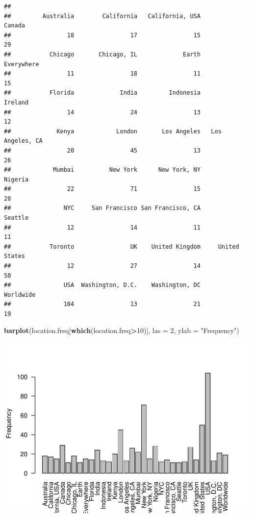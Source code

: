 \documentclass[
]{article}
\newenvironment{Shaded}{\begin{snugshade}}{\end{snugshade}}
\newcommand{\DataTypeTok}[1]{\textcolor[rgb]{0.13,0.29,0.53}{#1}}
\newcommand{\DecValTok}[1]{\textcolor[rgb]{0.00,0.00,0.81}{#1}}
\newcommand{\KeywordTok}[1]{\textcolor[rgb]{0.13,0.29,0.53}{\textbf{#1}}}
\newcommand{\NormalTok}[1]{#1}
\newcommand{\OperatorTok}[1]{\textcolor[rgb]{0.81,0.36,0.00}{\textbf{#1}}}
\newcommand{\StringTok}[1]{\textcolor[rgb]{0.31,0.60,0.02}{#1}}
\begin{document}
\begin{verbatim}
## 
##         Australia        California   California, USA            Canada 
##                18                17                15                29 
##           Chicago       Chicago, IL             Earth        Everywhere 
##                11                18                11                15 
##           Florida             India         Indonesia           Ireland 
##                14                24                13                12 
##             Kenya            London       Los Angeles   Los Angeles, CA 
##                20                45                13                26 
##            Mumbai          New York      New York, NY           Nigeria 
##                22                71                15                28 
##               NYC     San Francisco San Francisco, CA           Seattle 
##                12                14                11                11 
##           Toronto                UK    United Kingdom     United States 
##                12                27                14                50 
##               USA  Washington, D.C.    Washington, DC         Worldwide 
##               104                13                21                19
\end{verbatim}

\begin{Shaded}
\begin{Highlighting}[]
\KeywordTok{barplot}\NormalTok{(location.freq[}\KeywordTok{which}\NormalTok{(location.freq}\OperatorTok{>}\DecValTok{10}\NormalTok{)], }\DataTypeTok{las =} \DecValTok{2}\NormalTok{,  }
        \DataTypeTok{ylab =} \StringTok{"Frequency"}\NormalTok{)}
\end{Highlighting}
\end{Shaded}

\begin{center}\includegraphics[width=0.7\linewidth]{document_files/figure-latex/unnamed-chunk-13-1} \end{center}
\end{document}
